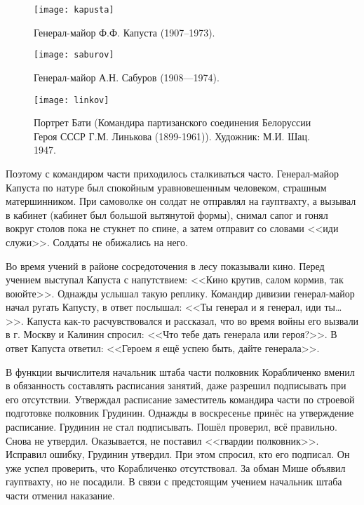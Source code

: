 \begin{figure}[h]
	\centering
	
	\begin{minipage}[h]{0.3\textwidth}			
		\texttt{[image: kapusta]}
		\caption{Генерал-майор Ф.Ф. Капуста (1907--1973).}
		\label{fig:kapusta}		
	\end{minipage}	
	\hfill
	\begin{minipage}[h]{0.3\textwidth}			
		\texttt{[image: saburov]}
		\caption{Генерал-майор А.Н. Сабуров (1908—1974).}
		\label{fig:saburov}
	\end{minipage}
	\hfill
	\begin{minipage}[h]{0.3\textwidth}		
		\texttt{[image: linkov]}
		\caption{Портрет Бати (Командира партизанского соединения Белоруссии Героя СССР Г.М. Линькова (1899-1961)). Художник: М.И. Шац. 1947.}
		\label{fig:linkov}
	\end{minipage}
\end{figure}

Поэтому с командиром части приходилось сталкиваться часто. Генерал-майор Капуста по натуре был спокойным уравновешенным человеком, страшным матершинником. При самоволке он солдат не отправлял на гауптвахту, а вызывал в кабинет (кабинет был большой вытянутой формы), снимал сапог и гонял вокруг столов пока не стукнет по спине, а затем отправит со словами <<иди служи>>. Солдаты не обижались на него.

Во время учений в районе сосредоточения в лесу показывали кино. Перед учением выступал Капуста с напутствием: <<Кино крутив, салом кормив, так воюйте>>. Однажды услышал такую реплику. Командир дивизии генерал-майор начал ругать Капусту, в ответ послышал: <<Ты генерал и я генерал, иди ты…>>. Капуста как-то расчувствовался и рассказал, что во время войны его вызвали в г. Москву и Калинин спросил: <<Что тебе дать генерала или героя?>>. В ответ Капуста ответил: <<Героем я ещё успею быть, дайте генерала>>. 

В функции вычислителя начальник штаба части полковник Корабличенко вменил в обязанность составлять расписания занятий, даже разрешил подписывать при его отсутствии. Утверждал расписание заместитель командира части по строевой подготовке полковник Грудинин. Однажды в воскресенье принёс на утверждение расписание. Грудинин не стал подписывать. Пошёл проверил, всё правильно. Снова не утвердил. Оказывается, не поставил <<гвардии полковник>>. Исправил ошибку, Грудинин утвердил. При этом спросил, кто его подписал. Он уже успел проверить, что Корабличенко отсутствовал. За обман Мише объявил гауптвахту, но не посадили. В связи с предстоящим учением начальник штаба части отменил наказание.

